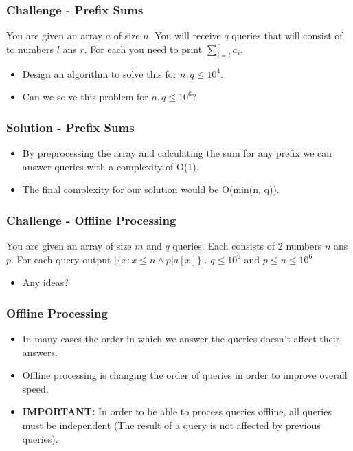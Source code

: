 \documentclass{beamer}
\begin{document}
\begin{frame}
	\frametitle{Challenge - Prefix Sums}

	You are given an array $a$ of size $n$. You will receive $q$ queries that will consist of to numbers $l$ ans $r$. For each you need to print $\sum\limits_{i = l}^{r}a_i$.

	\begin{itemize}
		\item<1-> Design an algorithm to solve this for $n,q \leq 10^4$.
		\item<2-> Can we solve this problem for $n,q \leq 10^6$?
	\end{itemize}
\end{frame}

\begin{frame}[fragile]
	\frametitle{Solution - Prefix Sums}

	\begin{itemize}
		\item By preprocessing the array and calculating the sum for any prefix we can answer queries with a complexity of O(1). 
		\item The final complexity for our solution would be O(min(n, q)).
	\end{itemize}

	
\end{frame}

\begin{frame}
	\frametitle{Challenge - Offline Processing}

	You are given an array of size $m$ and $q$ queries. Each consists of 2 numbers $n$ ans $p$. For each query output $|\{x : x \leq n \wedge p|a[x]\}|$. $q \leq 10^6$ and $p \leq n \leq 10^6$

	\begin{itemize}
		\item Any ideas?
	\end{itemize}
\end{frame}

\begin{frame}
	\frametitle{Offline Processing}

	\begin{itemize}
		\item In many cases the order in which we answer the queries doesn't affect their answers.
		\item Offline processing is changing the order of queries in order to improve overall speed.
		\item \textbf{IMPORTANT:} In order to be able to process queries offline, all queries must be independent (The result of a query is not affected by previous queries).
	\end{itemize}
\end{frame}
\end{document}
